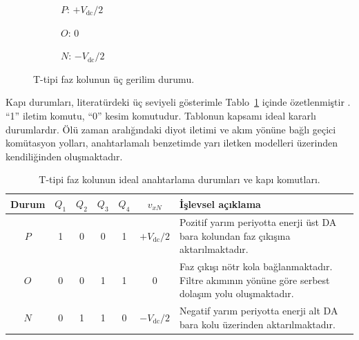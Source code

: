 \begin{figure}[H]
  \centering
  \begin{subfigure}[t]{0.32\textwidth}
    \centering
    \caption{$P$: $+V_{\mathrm{dc}}/2$}
  \end{subfigure}\hfill
  \begin{subfigure}[t]{0.32\textwidth}
    \centering
    \caption{$O$: $0$}
  \end{subfigure}\hfill
  \begin{subfigure}[t]{0.32\textwidth}
    \centering
    \caption{$N$: $-V_{\mathrm{dc}}/2$}
  \end{subfigure}

  \vspace{3mm}
  \caption{T-tipi faz kolunun üç gerilim durumu.}
  \label{fig:t-tipi-uc-seviye}
\end{figure}

Kapı durumları, literatürdeki üç seviyeli gösterimle Tablo~\ref{tab:t-tipi-durumlar} içinde özetlenmiştir \citep{Holmes2003,Wang2020}. ``1'' iletim komutu, ``0'' kesim komutudur. Tablonun kapsamı ideal kararlı durumlardır. Ölü zaman aralığındaki diyot iletimi ve akım yönüne bağlı geçici komütasyon yolları, anahtarlamalı benzetimde yarı iletken modelleri üzerinden kendiliğinden oluşmaktadır.

\begin{table}[H]
  \centering
  \caption{T-tipi faz kolunun ideal anahtarlama durumları ve kapı komutları.}
  \label{tab:t-tipi-durumlar}
  \small
  \begin{tabularx}{\textwidth}{c c c c c c X}
    \toprule
    Durum & $Q_1$ & $Q_2$ & $Q_3$ & $Q_4$ & $v_{xN}$ & İşlevsel açıklama \\
    \midrule
    $P$ & 1 & 0 & 0 & 1 & $+V_{\mathrm{dc}}/2$ & Pozitif yarım periyotta enerji üst DA bara kolundan faz çıkışına aktarılmaktadır. \\
    $O$ & 0 & 0 & 1 & 1 & $0$ & Faz çıkışı nötr kola bağlanmaktadır. Filtre akımının yönüne göre serbest dolaşım yolu oluşmaktadır. \\
    $N$ & 0 & 1 & 1 & 0 & $-V_{\mathrm{dc}}/2$ & Negatif yarım periyotta enerji alt DA bara kolu üzerinden aktarılmaktadır. \\
    \bottomrule
  \end{tabularx}
\end{table}

